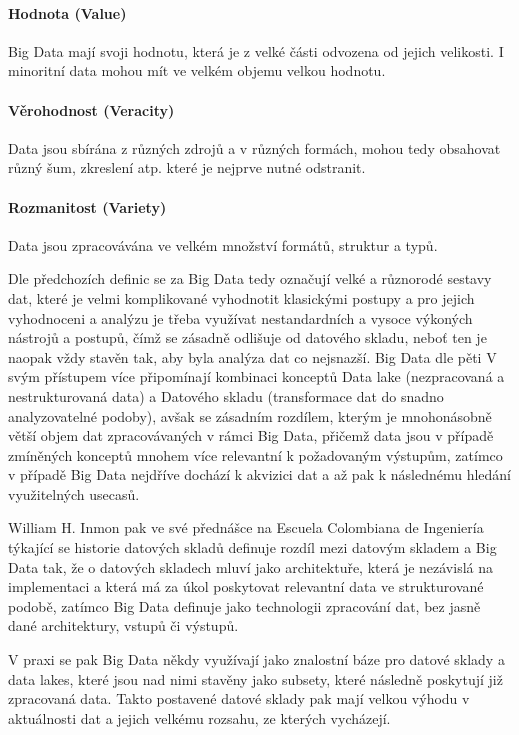 \documentclass[
  digital,     %
  twoside,     %
  lof,         %
  lot,         %
]{fithesis4}
\begin{document}
\paragraph{Hodnota (Value)}
Big Data mají svoji hodnotu, která je z velké části odvozena od jejich velikosti. I minoritní data mohou mít ve velkém objemu velkou hodnotu. 

\paragraph{Věrohodnost (Veracity)}
Data jsou sbírána z různých zdrojů a v různých formách, mohou tedy obsahovat různý šum, zkreslení atp. které je nejprve nutné odstranit.

\paragraph{Rozmanitost (Variety)}
Data jsou zpracovávána ve velkém množství formátů, struktur a typů.


Dle předchozích definic se za Big Data tedy označují velké a různorodé sestavy dat, které je velmi komplikované vyhodnotit klasickými postupy a pro jejich vyhodnoceni a analýzu je  třeba využívat nestandardních a vysoce výkoných nástrojů a postupů, čímž se zásadně odlišuje od datového skladu, neboť ten je naopak vždy stavěn tak, aby byla analýza dat co nejsnazší.  Big Data dle pěti V svým přístupem více připomínají kombinaci konceptů Data lake (nezpracovaná a nestrukturovaná data) a Datového skladu (transformace dat do snadno analyzovatelné podoby), avšak se zásadním rozdílem, kterým je mnohonásobně větší objem dat zpracovávaných v rámci Big Data, přičemž data jsou v případě zmíněných konceptů mnohem více relevantní k požadovaným výstupům, zatímco v případě Big Data nejdříve dochází k akvizici dat a až pak k následnému hledání využitelných usecasů.

William H. Inmon pak ve své přednášce na Escuela Colombiana de Ingeniería týkající se historie datových skladů definuje rozdíl mezi datovým skladem a Big Data tak, že o datových skladech mluví jako architektuře, která je nezávislá na implementaci a která má za úkol poskytovat relevantní data ve strukturované podobě, zatímco Big Data definuje jako technologii zpracování dat, bez jasně dané architektury, vstupů či výstupů. \parencite{Inmon2021}

V praxi se pak Big Data někdy využívají jako znalostní báze pro datové sklady a data lakes, které jsou nad nimi stavěny jako subsety, které následně poskytují již zpracovaná data. Takto postavené datové sklady pak mají velkou výhodu v aktuálnosti dat a jejich velkému rozsahu, ze kterých vycházejí. 
\end{document}
